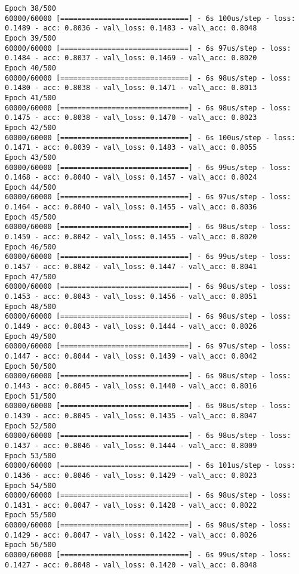 \documentclass[11pt]{article}
\begin{document}
\begin{Verbatim}[commandchars=\\\{\}]
Epoch 38/500
60000/60000 [==============================] - 6s 100us/step - loss: 0.1489 - acc: 0.8036 - val\_loss: 0.1483 - val\_acc: 0.8048
Epoch 39/500
60000/60000 [==============================] - 6s 97us/step - loss: 0.1484 - acc: 0.8037 - val\_loss: 0.1469 - val\_acc: 0.8020
Epoch 40/500
60000/60000 [==============================] - 6s 98us/step - loss: 0.1480 - acc: 0.8038 - val\_loss: 0.1471 - val\_acc: 0.8013
Epoch 41/500
60000/60000 [==============================] - 6s 98us/step - loss: 0.1475 - acc: 0.8038 - val\_loss: 0.1470 - val\_acc: 0.8023
Epoch 42/500
60000/60000 [==============================] - 6s 100us/step - loss: 0.1471 - acc: 0.8039 - val\_loss: 0.1483 - val\_acc: 0.8055
Epoch 43/500
60000/60000 [==============================] - 6s 99us/step - loss: 0.1468 - acc: 0.8040 - val\_loss: 0.1457 - val\_acc: 0.8024
Epoch 44/500
60000/60000 [==============================] - 6s 97us/step - loss: 0.1464 - acc: 0.8040 - val\_loss: 0.1455 - val\_acc: 0.8036
Epoch 45/500
60000/60000 [==============================] - 6s 98us/step - loss: 0.1459 - acc: 0.8042 - val\_loss: 0.1455 - val\_acc: 0.8020
Epoch 46/500
60000/60000 [==============================] - 6s 99us/step - loss: 0.1457 - acc: 0.8042 - val\_loss: 0.1447 - val\_acc: 0.8041
Epoch 47/500
60000/60000 [==============================] - 6s 98us/step - loss: 0.1453 - acc: 0.8043 - val\_loss: 0.1456 - val\_acc: 0.8051
Epoch 48/500
60000/60000 [==============================] - 6s 98us/step - loss: 0.1449 - acc: 0.8043 - val\_loss: 0.1444 - val\_acc: 0.8026
Epoch 49/500
60000/60000 [==============================] - 6s 97us/step - loss: 0.1447 - acc: 0.8044 - val\_loss: 0.1439 - val\_acc: 0.8042
Epoch 50/500
60000/60000 [==============================] - 6s 98us/step - loss: 0.1443 - acc: 0.8045 - val\_loss: 0.1440 - val\_acc: 0.8016
Epoch 51/500
60000/60000 [==============================] - 6s 98us/step - loss: 0.1439 - acc: 0.8045 - val\_loss: 0.1435 - val\_acc: 0.8047
Epoch 52/500
60000/60000 [==============================] - 6s 98us/step - loss: 0.1437 - acc: 0.8046 - val\_loss: 0.1444 - val\_acc: 0.8009
Epoch 53/500
60000/60000 [==============================] - 6s 101us/step - loss: 0.1436 - acc: 0.8046 - val\_loss: 0.1429 - val\_acc: 0.8023
Epoch 54/500
60000/60000 [==============================] - 6s 98us/step - loss: 0.1431 - acc: 0.8047 - val\_loss: 0.1428 - val\_acc: 0.8022
Epoch 55/500
60000/60000 [==============================] - 6s 98us/step - loss: 0.1429 - acc: 0.8047 - val\_loss: 0.1422 - val\_acc: 0.8026
Epoch 56/500
60000/60000 [==============================] - 6s 99us/step - loss: 0.1427 - acc: 0.8048 - val\_loss: 0.1420 - val\_acc: 0.8048

\end{Verbatim}
\end{document}
